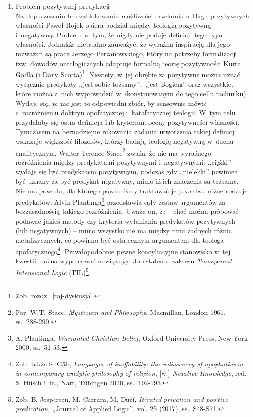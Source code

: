 \begin{enumerate}[label = \arabic*), itemindent=6mm, labelwidth=4mm, labelsep=2mm, itemsep=1em, leftmargin=0mm]
\item Problem pozytywnej predykacji\\
Na dopuszczeniu lub zablokowaniu możliwości orzekania o~Bogu pozytywnych własności Paweł Rojek opiera podział między teologią pozytywną i~negatywną. Problem w~tym, że nigdy nie podaje definicji tego typu własności. Jednakże nietrudno zauważyć, że wyraźną inspiracją dla jego rozważań są prace Jerzego Perzanowskiego, który na potrzeby formalizacji tzw. dowodów ontologicznych adaptuje formalną teorię pozytywności Kurta Gödla (i Dany Scotta)\footnote{Zob. rozdz.~\ref{roj-dyskusja}.}. Niestety, w~jej obrębie za pozytywne można uznać wyłącznie predykaty ,,jest sobie tożsamy'', ,,jest Bogiem'' oraz wszystkie, które można z~nich wyprowadzić w~skonstruowanym do tego cellu rachunku). Wydaje się, że nie jest to odpowiedni zbiór, by sensownie mówić o~rozróżnieniu doktryn apofatycznej i~katafatycznej teologii. W~tym celu przydałaby się ostra definicja lub kryterium oceny pozytywności własności. Tymczasem na beznadziejne rokowania zadania utworzenia takiej definicji wskazuje większość filozofów, którzy badają teologię negatywną w~duchu analitycznym. Walter Terence Stace\footnote{Por. W.T. Stace, \textit{Mysticism and Philosophy}, Macmillan, London 1961, ss.~288-290.} zważa, że nie ma wyraźnego rozróżnienia między predykatami pozytywnymi i~negatywnymi: ,,ciężki'' wydaje się być predykatem pozytywnym, podczas gdy ,,nielekki'' powinien być uznany za być predykat negatywny, mimo iż ich znaczenia są tożsame. Nie ma powodu, dla którego powinniśmy traktować je jako dwa różne rodzaje predykatów. Alvin Plantinga\footnote{A. Plantinga, \textit{Warranted Christian Belief}, Oxford University Press, New York 2000, ss.~51-53.} przedstawia cały zestaw argumentów za bezzasadnością takiego rozróżnienia. Uważa on, że -- choć można próbować podawać jakieś metody czy kryteria wyłaniania predykatów pozytywnych (lub negatywnych) -- mimo wszystko nie ma między nimi żadnych różnic metafizycznych, co powinno być ostatecznym argumentem dla teologa apofatycznego\footnote{Zob. także S. Gäb, \textit{Languages of ineffability: the rediscovery of apophaticism in contemporary analytic philosophy of religion}, [w:] \textit{Negative Knowledge}, red. S. Hüsch i~in., Narr, Tübingen 2020, ss.~192-193.}. Prawdopodobnie pewne koncyliacyjne stanowisko w~tej kwestii można wypracować nawiązując do ustaleń z~zakresu \textit{Transparent Intensional Logic} (TIL)\footnote{Zob. B. Jespersen, M. Carrara, M. Duží, \textit{Iterated privation and positive predication}, ,,Journal of Applied Logic'', vol. 25 (2017), ss.~S48-S71.}.


\end{enumerate}
